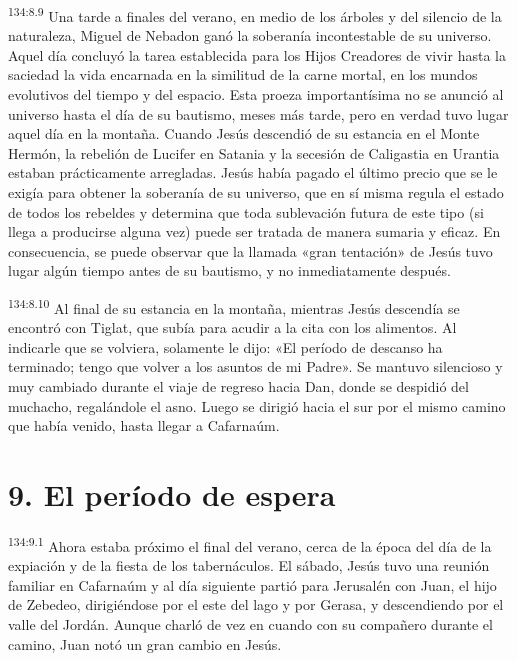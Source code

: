 \par 
\textsuperscript{134:8.9} Una tarde a finales del verano, en medio de los árboles y del silencio de la naturaleza, Miguel de Nebadon ganó la soberanía incontestable de su universo. Aquel día concluyó la tarea establecida para los Hijos Creadores de vivir hasta la saciedad la vida encarnada en la similitud de la carne mortal, en los mundos evolutivos del tiempo y del espacio. Esta proeza importantísima no se anunció al universo hasta el día de su bautismo, meses más tarde, pero en verdad tuvo lugar aquel día en la montaña. Cuando Jesús descendió de su estancia en el Monte Hermón, la rebelión de Lucifer en Satania y la secesión de Caligastia en Urantia estaban prácticamente arregladas. Jesús había pagado el último precio que se le exigía para obtener la soberanía de su universo, que en sí misma regula el estado de todos los rebeldes y determina que toda sublevación futura de este tipo (si llega a producirse alguna vez) puede ser tratada de manera sumaria y eficaz. En consecuencia, se puede observar que la llamada «gran tentación» de Jesús tuvo lugar algún tiempo antes de su bautismo, y no inmediatamente después.

\par 
\textsuperscript{134:8.10} Al final de su estancia en la montaña, mientras Jesús descendía se encontró con Tiglat, que subía para acudir a la cita con los alimentos. Al indicarle que se volviera, solamente le dijo: «El período de descanso ha terminado; tengo que volver a los asuntos de mi Padre». Se mantuvo silencioso y muy cambiado durante el viaje de regreso hacia Dan, donde se despidió del muchacho, regalándole el asno. Luego se dirigió hacia el sur por el mismo camino que había venido, hasta llegar a Cafarnaúm.

\section*{9. El período de espera}
\par 
\textsuperscript{134:9.1} Ahora estaba próximo el final del verano, cerca de la época del día de la expiación y de la fiesta de los tabernáculos. El sábado, Jesús tuvo una reunión familiar en Cafarnaúm y al día siguiente partió para Jerusalén con Juan, el hijo de Zebedeo, dirigiéndose por el este del lago y por Gerasa, y descendiendo por el valle del Jordán. Aunque charló de vez en cuando con su compañero durante el camino, Juan notó un gran cambio en Jesús.


